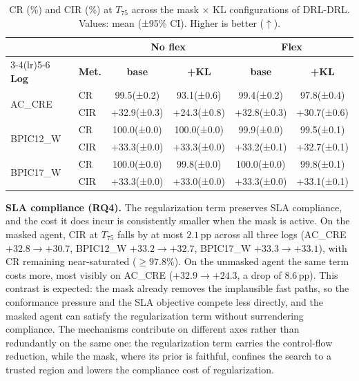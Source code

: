\documentclass[journal,onecolumn]{IEEEtran}
\begin{document}
\begin{table}[!ht]
\centering\scriptsize
\setlength{\tabcolsep}{2.5pt}
\renewcommand{\arraystretch}{1.1}
\begin{tabular}{ll cccc}
\toprule
& & \multicolumn{2}{c}{\textbf{No flex}} &
    \multicolumn{2}{c}{\textbf{Flex}} \\
\cmidrule(lr){3-4}\cmidrule(lr){5-6}
\textbf{Log} & \textbf{Met.} &
\textbf{base} & \textbf{+KL} &
\textbf{base} & \textbf{+KL} \\
\midrule
\multirow{2}{*}{AC\_CRE}
  & CR  & 99.5{\tiny(±0.2)} & 93.1{\tiny(±0.6)} & 99.4{\tiny(±0.2)} & 97.8{\tiny(±0.4)} \\
  & CIR & +32.9{\tiny(±0.3)} & +24.3{\tiny(±0.8)} & +32.8{\tiny(±0.3)} & +30.7{\tiny(±0.6)} \\
\midrule
\multirow{2}{*}{BPIC12\_W}
  & CR  & 100.0{\tiny(±0.0)} & 100.0{\tiny(±0.0)} & 99.9{\tiny(±0.0)} & 99.5{\tiny(±0.1)} \\
  & CIR & +33.3{\tiny(±0.0)} & +33.3{\tiny(±0.0)} & +33.2{\tiny(±0.1)} & +32.7{\tiny(±0.1)} \\
\midrule
\multirow{2}{*}{BPIC17\_W}
  & CR  & 100.0{\tiny(±0.0)} & 99.8{\tiny(±0.0)} & 100.0{\tiny(±0.0)} & 99.8{\tiny(±0.1)} \\
  & CIR & +33.3{\tiny(±0.0)} & +33.0{\tiny(±0.0)} & +33.3{\tiny(±0.0)} & +33.1{\tiny(±0.1)} \\
\bottomrule
\end{tabular}
\caption[CR and CIR under mask $\times$ KL configurations]{CR (\%) and CIR (\%) at $T_{75}$ across the mask $\times$ KL
configurations of DRL-DRL. Values: mean (±95\% CI). Higher is better
($\uparrow$).}
\label{tab:reg_compliance}
\end{table}

\noindent\textbf{SLA compliance (RQ4).}
The regularization term preserves SLA compliance, and the cost it does
incur is consistently smaller when the mask is active. On the masked
agent, CIR at $T_{75}$ falls by at most $2.1$\,pp across all three logs
(AC\_CRE $+32.8 \to +30.7$, BPIC12\_W $+33.2 \to +32.7$, BPIC17\_W
$+33.3 \to +33.1$), with CR remaining near-saturated ($\geq 97.8\%$).
On the unmasked agent the same term costs more, most visibly on
AC\_CRE ($+32.9 \to +24.3$, a drop of $8.6$\,pp). This contrast is
expected: the mask already removes the implausible fast paths, so the
conformance pressure and the SLA objective compete less directly, and
the masked agent can satisfy the regularization term without
surrendering compliance. The mechanisms contribute on different axes rather than redundantly on the same one: the regularization term carries the control-flow reduction, while the mask, where its prior is faithful, confines the search to a trusted region and lowers the compliance cost of
regularization.
\end{document}
